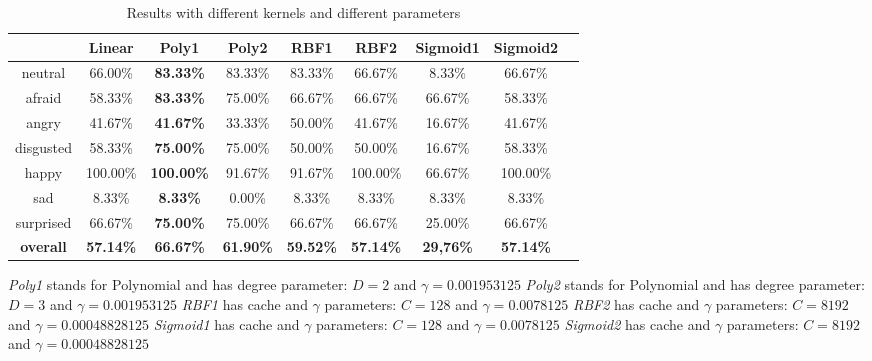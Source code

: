 \begin{table}[h]
\begin{center}
   \caption{\label{table_results_kernels} Results with different kernels and different parameters}
\begin{tabular}{|c|c|c|c|c|c|c|c|c|}
  \hline
    & Linear & \textbf{Poly1} & Poly2 & RBF1 & RBF2 & Sigmoid1 & Sigmoid2 \\
  \hline
  neutral & 66.00\% & \textbf{83.33\%} & 83.33\% & 83.33\% & 66.67\% & 8.33\% & 66.67\% \\
  afraid & 58.33\% & \textbf{83.33\%} & 75.00\% & 66.67\% & 66.67\% & 66.67\% & 58.33\% \\
  angry & 41.67\% & \textbf{41.67\%} & 33.33\% & 50.00\% & 41.67\% & 16.67\% & 41.67\% \\
  disgusted & 58.33\% & \textbf{75.00\%} & 75.00\% & 50.00\% & 50.00\% & 16.67\% & 58.33\% \\
  happy & 100.00\% & \textbf{100.00\%} & 91.67\% & 91.67\% & 100.00\% & 66.67\% & 100.00\% \\
  sad & 8.33\% & \textbf{8.33\%} & 0.00\% & 8.33\% & 8.33\% & 8.33\% & 8.33\% \\
  surprised & 66.67\% & \textbf{75.00\%} & 75.00\% & 66.67\% & 66.67\% & 25.00\% & 66.67\% \\
  \textbf{overall} & \textbf{57.14\%} & \textbf{{\color{red}66.67\%}} & \textbf{61.90\%} & \textbf{59.52\%} & \textbf{57.14\%} & \textbf{29,76\%} & \textbf{57.14\%} \\
  \hline
\end{tabular}
\end{center} 
\end{table}

\noindent \textit{Poly1} stands for Polynomial and has degree parameter: $ D = 2 $ and $ \gamma = 0.001953125 $
\newline
\noindent \textit{Poly2} stands for Polynomial and has degree parameter: $ D = 3 $ and $ \gamma = 0.001953125 $
\newline
\noindent \textit{RBF1} has cache and $\gamma$ parameters: $ C = 128 $ and $ \gamma = 0.0078125 $
\newline
\noindent \textit{RBF2} has cache and $\gamma$ parameters: $ C = 8192 $ and $ \gamma = 0.00048828125 $ 
\newline
\noindent \textit{Sigmoid1} has cache and $\gamma$ parameters: $ C = 128 $ and $ \gamma = 0.0078125 $
\newline
\noindent \textit{Sigmoid2} has cache and $\gamma$ parameters: $ C = 8192 $ and $ \gamma = 0.00048828125 $
\newline

